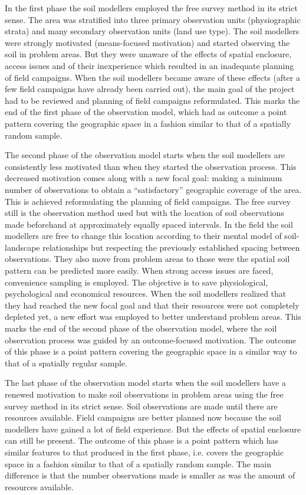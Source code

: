 In the first phase the soil modellers employed the free survey method in its strict sense. The area was 
stratified into three primary observation units (physiographic strata) and many secondary observation units 
(land use type). The soil modellers were strongly motivated (means-focused motivation) and started observing 
the soil in problem areas. But they were unaware of the effects of spatial enclosure, access issues and of 
their inexperience which resulted in an inadequate planning of field campaigns. When the soil modellers became
aware of these effects (after a few field campaigns have already been carried out), the main goal of the 
project had to be reviewed and planning of field campaigns reformulated. This marks the end of the first phase 
of the observation model, which had as outcome a point pattern covering the geographic space in a fashion 
similar to that of a spatially random sample.

The second phase of the observation model starts when the soil modellers are consistently less motivated than 
when they started the observation process. This decreased motivation comes along with a new focal goal: making 
a minimum number of observations to obtain a ``satisfactory'' geographic coverage of the area. This is achieved
reformulating the planning of field campaigns. The free survey still is the observation method used but with 
the location of soil observations made beforehand at approximately equally spaced intervals. In the field the 
soil modellers are free to change this location according to their mental model of soil-landscape 
relationships but respecting the previously established spacing between observations. They also move from 
problem areas to those were the spatial soil pattern can be predicted more easily. When strong access issues 
are faced, convenience sampling is employed. The objective is to save physiological, psychological and 
economical resources. When the soil modellers realized that they had reached the new focal goal and that their
resources were not completely depleted yet, a new effort was employed to better understand problem areas. This 
marks the end of the second phase of the observation model, where the soil observation process was guided by an
outcome-focused motivation. The outcome of this phase is a point pattern covering the geographic space in a 
similar way to that of a spatially regular sample.

The last phase of the observation model starts when the soil modellers have a renewed motivation to make soil 
observations in problem areas using the free survey method in its strict sense. Soil observations are made 
until there are resources available. Field campaigns are better planned now because the soil modellers have 
gained a lot of field experience. But the effects of spatial enclosure can still be present. The outcome of 
this phase is a point pattern which has similar features to that produced in the first phase, i.e. covers the 
geographic space in a fashion similar to that of a spatially random sample. The main difference is that the 
number observations made is smaller as was the amount of resources available.

